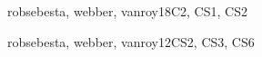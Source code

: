 \begin{syllabus}
\begin{unit}{\PLTypeSystems}{}{robsebesta, webber, vanroy}{18}{C2, CS1, CS2}
\begin{topics}%
    \item \PLTypeSystemsTopicCompositional
    \item \PLTypeSystemsTopicType
    \item \PLTypeSystemsTopicTypeSafety
    \item \PLTypeSystemsTopicTypeInference
    \item \PLTypeSystemsTopicStatic
\end{topics}
\begin{learningoutcomes}%
        \item \PLTypeSystemsLODefineAPrecisely [\Usage] %
        \item \PLTypeSystemsLOForVarious [\Familiarity] %
        \item \PLTypeSystemsLOPrecisely [\Familiarity] %
        \item \PLTypeSystemsLOProveType [\Usage] %
        \item \PLTypeSystemsLOImplementAType [\Usage] %
        \item \PLTypeSystemsLOExplainHowAndAlgorithms [\Familiarity] %
\end{learningoutcomes}%
\end{unit}

\begin{unit}{\PLObjectOrientedProgramming}{}{robsebesta, webber, vanroy}{12}{CS2, CS3, CS6}
\begin{topics}%
    \item \PLObjectOrientedProgrammingTopicObject
    \item \PLObjectOrientedProgrammingTopicDefinition
    \item \PLObjectOrientedProgrammingTopicSubclasses
    \item \PLObjectOrientedProgrammingTopicDynamic
    \item \PLObjectOrientedProgrammingTopicSubtyping
    \item \PLObjectOrientedProgrammingTopicObjectOriented
    \item \PLObjectOrientedProgrammingTopicUsing
\end{topics}
\begin{learningoutcomes}%
    \item \PLObjectOrientedProgrammingLODesignAndClass [\Usage]
    \item \PLObjectOrientedProgrammingLOUseSubclassing [\Usage]
    \item \PLObjectOrientedProgrammingLOCorrectly [\Usage]
    \item \PLObjectOrientedProgrammingLOCompareAndThe [\Assessment]
    \item \PLObjectOrientedProgrammingLOExplainTheObject [\Usage] 
    \item \PLObjectOrientedProgrammingLOUseObject [\Usage] 
    \item \PLObjectOrientedProgrammingLODefineAndAnd [\Usage] 
\end{learningoutcomes}%
\end{unit}


\end{syllabus}
